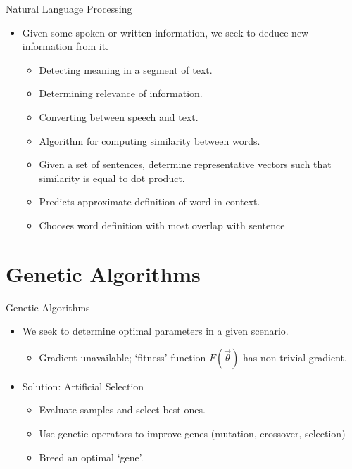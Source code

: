 \documentclass[11pt]{beamer}
\begin{document}
\begin{frame}{Natural Language Processing}
\begin{itemize}
    \item Given some spoken or written information, we seek to deduce new information from it.
    \begin{itemize}
        \item Detecting meaning in a segment of text.
        \item Determining relevance of information.
        \item Converting between speech and text.
    \end{itemize}
    \begin{itemize}
        \item Algorithm for computing similarity between words.
        \item Given a set of sentences, determine representative vectors such that similarity is equal to dot product.
    \end{itemize}
    \begin{itemize}
        \item Predicts approximate definition of word in context.
        \item Chooses word definition with most overlap with sentence
    \end{itemize}
\end{itemize}
\end{frame}

\section{Genetic Algorithms}

\begin{frame}{Genetic Algorithms}
\begin{itemize}
    \item We seek to determine optimal parameters in a given scenario.
    \begin{itemize}
        \item Gradient unavailable; `fitness' function $F(\vec{\theta})$ has non-trivial gradient.
    \end{itemize}
    \item Solution: Artificial Selection
    \begin{itemize}
        \item Evaluate samples and select best ones.
        \item Use genetic operators to improve genes (mutation, crossover, selection)
        \item Breed an optimal `gene'.
    \end{itemize}
\end{itemize}
\end{frame}
\end{document}
